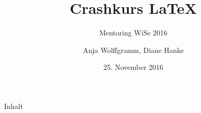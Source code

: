 \documentclass[ucs,9pt,english,ngerman,xcolor=table]{beamer}
\title{Crashkurs LaTeX}
\subtitle{Mentoring WiSe 2016}
\author{Anja Wolffgramm, Diane Hanke}
\institute[Freie Universität Berlin] %
{Freie Universität Berlin}
\date{25. November 2016}
\begin{document}
\begin{frame}[plain]
\titlepage
\end{frame}

\begin{frame}{Inhalt}%
\begin{multicols}{2}%
\tableofcontents
\end{multicols}
\end{frame}


%
%
%
%
%
% 
%
%
%
%
%
%
\end{document}
